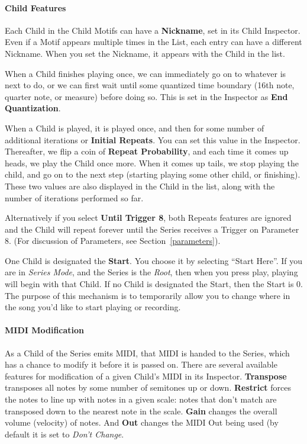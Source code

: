 \documentclass[twoside,10pt]{article}
\begin{document}
\paragraph{Child Features}
Each Child in the Child Motifs can have a {\bf Nickname}, set in its Child Inspector.  Even if a Motif appears multiple times in the List, each entry can have a different Nickname.  When you set the Nickname, it appears with the Child in the list.

When a Child finishes playing once, we can immediately go on to whatever is next to do, or we can first wait until some quantized time boundary (16th note, quarter note, or measure) before doing so.  This is set in the Inspector as {\bf End Quantization}.

When a Child is played, it is played once, and then for some number of additional iterations or {\bf Initial Repeats}.  You can set this value in the Inspector.  Thereafter, we flip a coin of {\bf Repeat Probability}, and each time it comes up heads, we play the Child once more. When it comes up tails, we stop playing the child, and go on to the next step (starting playing some other child, or finishing).  These two values are also displayed in the Child in the list, along with the number of iterations performed so far.

Alternatively if you select {\bf Until Trigger 8}, both Repeats features are ignored and the Child  will repeat forever until the Series receives a Trigger on Parameter 8.  (For discussion of Parameters, see Section~\ref{parameters}).

One Child is designated the {\bf Start}.  You choose it by selecting ``Start Here''.  If you are in {\it Series Mode}, and the Series is the {\it Root}, then when you press play, playing will begin with that Child.  If no Child is designated the Start, then the Start is 0.  The purpose of this mechanism is to temporarily allow you to change where in the song you'd like to start playing or recording.

\paragraph{MIDI Modification}

As a Child of the Series emits MIDI, that MIDI is handed to the Series, which has a chance to modify it before it is passed on.  There are several available features for modification of a given Child's MIDI in its Inspector.  {\bf Transpose} transposes all notes by some number of semitones up or down.  {\bf Restrict} forces the notes to line up with notes in a given scale: notes that don't match are transposed down to the nearest note in the scale.  {\bf Gain} changes the overall volume (velocity) of notes.  And {\bf Out} changes the MIDI Out being used (by default it is set to {\it Don't Change}.
\end{document}
